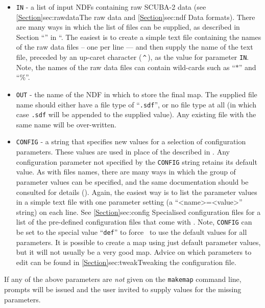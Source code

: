 \begin{itemize}

\item \texttt{IN} - a list of input NDFs containing raw SCUBA-2 data (see
\cref{Section}{sec:rawdata}{The raw data} and \cref{Section}{sec:ndf}
{Data formats}). There are many ways in which the list of files can be supplied,
as described in Section ``''
in ``. The easiest is to create a simple text
file containing the names of the raw data files -- one per line --- and
then supply the name of the text file, preceded by an up-caret character
(\,\texttt{\^{}}\,), as the value for parameter \texttt{IN}. Note, the names of
the raw data files can contain wild-cards such as ``$*$'' and ``\%''.

\item \texttt{OUT} - the name of the NDF in which to store the final
map. The supplied file name should either have a file type of
``\texttt{.sdf}'', or no file type at all (in which case \texttt{.sdf}
will be appended to the supplied value). Any existing file with the same
name will be over-written.

\item \texttt{CONFIG} - a string that specifies new values for a selection of
configuration parameters. These values are used in place of the
 described in
. Any configuration parameter not specified by
the \texttt{CONFIG} string retains its default value. As with files
names, there are many ways in which the group of parameter values can be
specified, and the same documentation should be consulted for details
(). Again, the easiest way is to list the
parameter values in a simple text file with one parameter setting (a
``<name>=<value>'' string) on each line. See \cref{Section}{sec:config}
{Specialised configuration files} for a list of the pre-defined
configuration files that come with \smurf. Note, \texttt{CONFIG}
can be set to the special value ``\texttt{def}'' to force \makemap\ to
use the default values for all parameters. It is possible to create a map
using just default parameter values, but it will not usually be a very
good map. Advice on which parameters to edit can be found in
\cref{Section}{sec:tweak}{Tweaking the configuration file}.

\end{itemize}

If any of the above parameters are \emph{not} given on the \texttt{makemap}
command line, prompts will be issued and the user invited to supply values
for the missing parameters.

